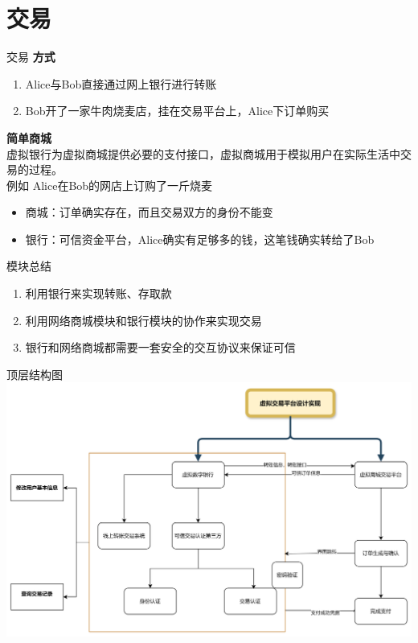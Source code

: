 \documentclass[]{beamer}
\begin{document}
    \section{交易}
    \begin{frame}{交易}
        \textbf{方式}
        \begin{enumerate}
            \item Alice与Bob直接通过网上银行进行转账
            \item Bob开了一家牛肉烧麦店，挂在交易平台上，Alice下订单购买
        \end{enumerate}
        \textbf{简单商城} \\[2ex]

        虚拟银行为虚拟商城提供必要的支付接口，虚拟商城用于模拟用户在实际生活中交易的过程。\\[2ex]

        例如 Alice在Bob的网店上订购了一斤烧麦\\[2ex]

        \begin{itemize}
            \item 商城：订单确实存在，而且交易双方的身份不能变
            \item 银行：可信资金平台，Alice确实有足够多的钱，这笔钱确实转给了Bob
        \end{itemize}
    \end{frame}

    \begin{frame}{模块总结}
        \begin{enumerate}
            \item 利用银行来实现转账、存取款
            \item 利用网络商城模块和银行模块的协作来实现交易
            \item 银行和网络商城都需要一套安全的交互协议来保证可信
        \end{enumerate}
    \end{frame}

    \begin{frame}{顶层结构图}
        \includegraphics[width=1\textwidth]{module.png}
    \end{frame}
    
\end{document}
